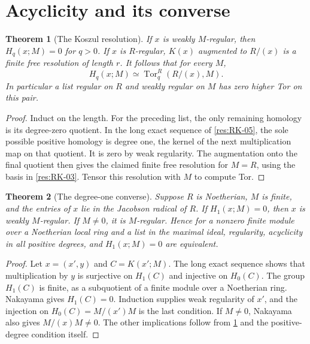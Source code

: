 \documentclass[11pt,oneside,openany]{book}
\newtheorem{theorem}{Theorem}[chapter]
\theoremstyle{definition}
\theoremstyle{remark}
\begin{document}
\section{Acyclicity and its converse}

\begin{theorem}[The Koszul resolution]\label{res:RK-07}
If $x$ is weakly $M$-regular, then $H_q(x;M)=0$ for $q>0$.
If $x$ is $R$-regular, $K(x)$ augmented to $R/(x)$ is a finite free
resolution of length $r$. It follows that for every $M$,
\[
 H_q(x;M)\simeq \operatorname{Tor}_q^R(R/(x),M).
\]
In particular a list regular on $R$ and weakly regular on $M$
has zero higher Tor on this pair.
\end{theorem}
\begin{proof}
Induct on the length. For the preceding list, the only remaining
homology is its degree-zero quotient. In the long exact sequence of
\ref{res:RK-05}, the sole possible positive homology is degree one,
the kernel of the next multiplication map on that quotient. It is
zero by weak regularity. The augmentation onto the final quotient
then gives the claimed finite free resolution for $M=R$, using the
basis in \ref{res:RK-03}. Tensor this resolution with $M$ to compute Tor.
\end{proof}

\begin{theorem}[The degree-one converse]\label{res:RK-08}
Suppose $R$ is Noetherian, $M$ is finite, and the entries of $x$
lie in the Jacobson radical of $R$. If $H_1(x;M)=0$, then $x$ is
weakly $M$-regular. If $M\ne0$, it is $M$-regular. Hence for a
nonzero finite module over a Noetherian local ring and a list in
the maximal ideal, regularity, acyclicity in all positive degrees,
and $H_1(x;M)=0$ are equivalent.
\end{theorem}
\begin{proof}
Let $x=(x',y)$ and $C=K(x';M)$. The long exact sequence shows that
multiplication by $y$ is surjective on $H_1(C)$ and injective on
$H_0(C)$. The group $H_1(C)$ is finite, as a subquotient of a
finite module over a Noetherian ring. Nakayama gives $H_1(C)=0$.
Induction supplies weak regularity of $x'$, and the injection on
$H_0(C)=M/(x')M$ is the last condition. If $M\ne0$, Nakayama
also gives $M/(x)M\ne0$. The other implications follow from
\ref{res:RK-07} and the positive-degree condition itself.
\end{proof}
\end{document}
